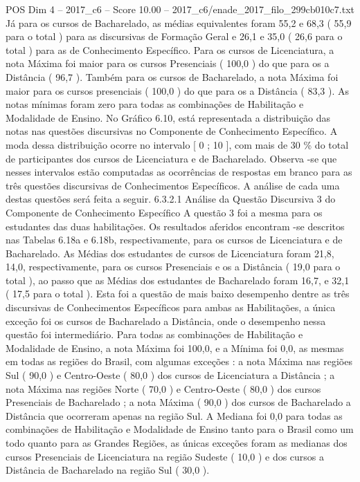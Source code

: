 \begin{textsample}{POS Dim 4 – 2017\_c6 – Score 10.00 – 2017\_c6/enade\_2017\_filo\_299cb010c7.txt}
Já para os cursos de Bacharelado, as médias equivalentes foram 55,2 e 68,3 ( 55,9 para o total ) para as discursivas de Formação Geral e 26,1 e 35,0 ( 26,6 para o total ) para as de Conhecimento Específico.
Para os cursos de Licenciatura, a nota Máxima foi maior para os cursos Presenciais ( 100,0 ) do que para os a Distância ( 96,7 ).
Também para os cursos de Bacharelado, a nota Máxima foi maior para os cursos presenciais ( 100,0 ) do que para os a Distância ( 83,3 ).
As notas mínimas foram zero para todas as combinações de Habilitação e Modalidade de Ensino.
No Gráfico 6.10, está representada a distribuição das notas nas questões discursivas no Componente de Conhecimento Específico.
A moda dessa distribuição ocorre no intervalo [ 0 ; 10 ], com mais de 30 \% do total de participantes dos cursos de Licenciatura e de Bacharelado.
Observa -se que nesses intervalos estão computadas as ocorrências de respostas em branco para as três questões discursivas de Conhecimentos Específicos.
A análise de cada uma destas questões será feita a seguir. 6.3.2.1 Análise da Questão Discursiva 3 do Componente de Conhecimento Específico A questão 3 foi a mesma para os estudantes das duas habilitações.
Os resultados aferidos encontram -se descritos nas Tabelas 6.18a e 6.18b, respectivamente, para os cursos de Licenciatura e de Bacharelado.
As Médias dos estudantes de cursos de Licenciatura foram 21,8, 14,0, respectivamente, para os cursos Presenciais e os a Distância ( 19,0 para o total ), ao passo que as Médias dos estudantes de Bacharelado foram 16,7, e 32,1 ( 17,5 para o total ).
Esta foi a questão de mais baixo desempenho dentre as três discursivas de Conhecimentos Específicos para ambas as Habilitações, a única exceção foi os cursos de Bacharelado a Distância, onde o desempenho nessa questão foi intermediário.
Para todas as combinações de Habilitação e Modalidade de Ensino, a nota Máxima foi 100,0, e a Mínima foi 0,0, as mesmas em todas as regiões do Brasil, com algumas exceções : a nota Máxima nas regiões Sul ( 90,0 ) e Centro-Oeste ( 80,0 ) dos cursos de Licenciatura a Distância ; a nota Máxima nas regiões Norte ( 70,0 ) e Centro-Oeste ( 80,0 ) dos cursos Presenciais de Bacharelado ; a nota Máxima ( 90,0 ) dos cursos de Bacharelado a Distância que ocorreram apenas na região Sul.
A Mediana foi 0,0 para todas as combinações de Habilitação e Modalidade de Ensino tanto para o Brasil como um todo quanto para as Grandes Regiões, as únicas exceções foram as medianas dos cursos Presenciais de Licenciatura na região Sudeste ( 10,0 ) e dos cursos a Distância de Bacharelado na região Sul ( 30,0 ).

\end{textsample}

